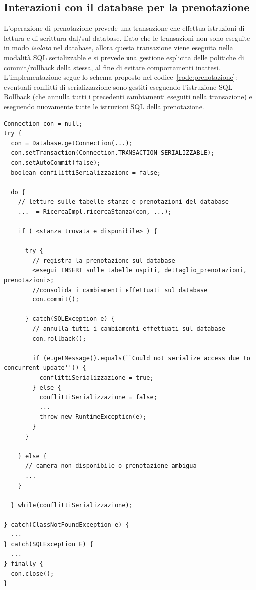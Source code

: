 \documentclass[a4paper]{article}
\begin{document}

\subsection{Interazioni con il database per la prenotazione}
\lstset{basicstyle=\small, language=Java, captionpos=b,  frame=simple, breaklines=true}
\label{sec:dettagli.prenotazione}

L'operazione di prenotazione prevede una transazione che effettua
istruzioni di lettura e di scrittura dal/sul database. Dato che le
transazioni non sono eseguite in modo \emph{isolato} nel database,
allora questa transazione viene eseguita nella modalit\`a SQL
serializzable e si prevede una gestione esplicita delle politiche di
commit/rollback della stessa, al fine di evitare comportamenti
inattesi. L'implementazione segue lo schema proposto nel
codice~\ref{code:prenotazione}: eventuali conflitti di serializzazione
sono gestiti eseguendo l'istruzione SQL Rollback (che annulla tutti i
precedenti cambiamenti eseguiti nella transazione) e eseguendo
nuovamente tutte le istruzioni SQL della prenotazione.

\begin{lstlisting}[label={code:prenotazione}, caption={schema Java per la gestione dei conflitti di serializzazione}]
Connection con = null;
try {
  con = Database.getConnection(...);
  con.setTransaction(Connection.TRANSACTION_SERIALIZZABLE);
  con.setAutoCommit(false);
  boolean confilittiSerializzazione = false; 

  do {
    // letture sulle tabelle stanze e prenotazioni del database
    ...  = RicercaImpl.ricercaStanza(con, ...);
  
    if ( <stanza trovata e disponibile> ) {

      try { 
        // registra la prenotazione sul database
        <esegui INSERT sulle tabelle ospiti, dettaglio_prenotazioni, prenotazioni>;
        //consolida i cambiamenti effettuati sul database
        con.commit();

      } catch(SQLException e) {
        // annulla tutti i cambiamenti effettuati sul database
        con.rollback();

        if (e.getMessage().equals(``Could not serialize access due to concurrent update'')) {
          conflittiSerializzazione = true;
        } else {
          conflittiSerializzazione = false;
          ...
          throw new RuntimeException(e);
        }
      }
      
    } else {
      // camera non disponibile o prenotazione ambigua
      ...
    }

  } while(conflittiSerializzazione);

} catch(ClassNotFoundException e) {
  ...
} catch(SQLException E) {
  ...
} finally {
  con.close();
}
\end{lstlisting}
\end{document}
